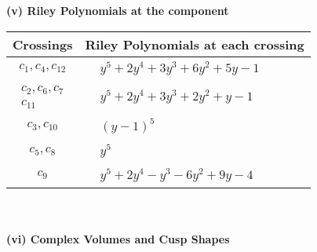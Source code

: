 \documentclass[1p]{elsarticle_modified}
\theoremstyle{definition}
\begin{document}
\newpage\renewcommand{\arraystretch}{1}
\flushleft \textbf{(v) Riley Polynomials at the component}\newline \\
\begin{tabular}{m{50pt}|m{274pt}}
Crossings & \hspace{64pt}Riley Polynomials at each crossing \\
\hline $$\begin{aligned}c_{1},c_{4},c_{12}\end{aligned}$$&$\begin{aligned}
&y^5+2 y^4+3 y^3+6 y^2+5 y-1
\end{aligned}$\\
\hline $$\begin{aligned}c_{2},c_{6},c_{7}\\c_{11}\end{aligned}$$&$\begin{aligned}
&y^5+2 y^4+3 y^3+2 y^2+y-1
\end{aligned}$\\
\hline $$\begin{aligned}c_{3},c_{10}\end{aligned}$$&$\begin{aligned}
&(y-1)^5
\end{aligned}$\\
\hline $$\begin{aligned}c_{5},c_{8}\end{aligned}$$&$\begin{aligned}
&y^5
\end{aligned}$\\
\hline $$\begin{aligned}c_{9}\end{aligned}$$&$\begin{aligned}
&y^5+2 y^4- y^3-6 y^2+9 y-4
\end{aligned}$\\
\hline
\end{tabular}\\~\\
\newpage\flushleft \textbf{(vi) Complex Volumes and Cusp Shapes}
\end{document}
